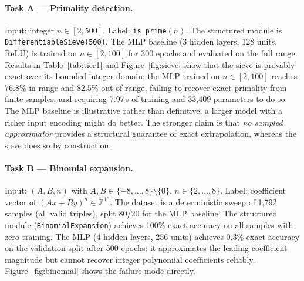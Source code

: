 \documentclass{article}
\begin{document}
\paragraph{Task A --- Primality detection.}
Input: integer $n \in [2, 500]$.
Label: \texttt{is\_prime}$(n)$.
The structured module is \texttt{DifferentiableSieve(500)}.
The MLP baseline (3 hidden layers, 128 units, ReLU) is trained on $n \in [2, 100]$ for
300 epochs and evaluated on the full range.
Results in Table~\ref{tab:tier1} and Figure~\ref{fig:sieve} show that the sieve
is provably exact over its bounded integer domain; the MLP trained on $n \in [2,100]$
reaches 76.8\% in-range and 82.5\% out-of-range, failing to recover exact primality
from finite samples, and requiring 7.97\,s of training and 33{,}409 parameters to do
so. The MLP baseline is illustrative rather than definitive: a larger model with a
richer input encoding might do better. The stronger claim is that \emph{no sampled
approximator} provides a structural guarantee of exact extrapolation, whereas the
sieve does so by construction.

\paragraph{Task B --- Binomial expansion.}
Input: $(A, B, n)$ with $A, B \in \{-8,\ldots,8\}\setminus\{0\}$, $n \in \{2,\ldots,8\}$.
Label: coefficient vector of $(Ax + By)^n \in \mathbb{Z}^{16}$.
The dataset is a deterministic sweep of 1{,}792 samples (all valid triples), split
80/20 for the MLP baseline.
The structured module (\texttt{BinomialExpansion}) achieves 100\% exact accuracy on
all samples with zero training. The MLP (4 hidden layers, 256 units) achieves 0.3\%
exact accuracy on the validation split after 500 epochs: it approximates the
leading-coefficient magnitude but cannot recover integer polynomial coefficients
reliably. Figure~\ref{fig:binomial} shows the failure mode directly.
\end{document}
